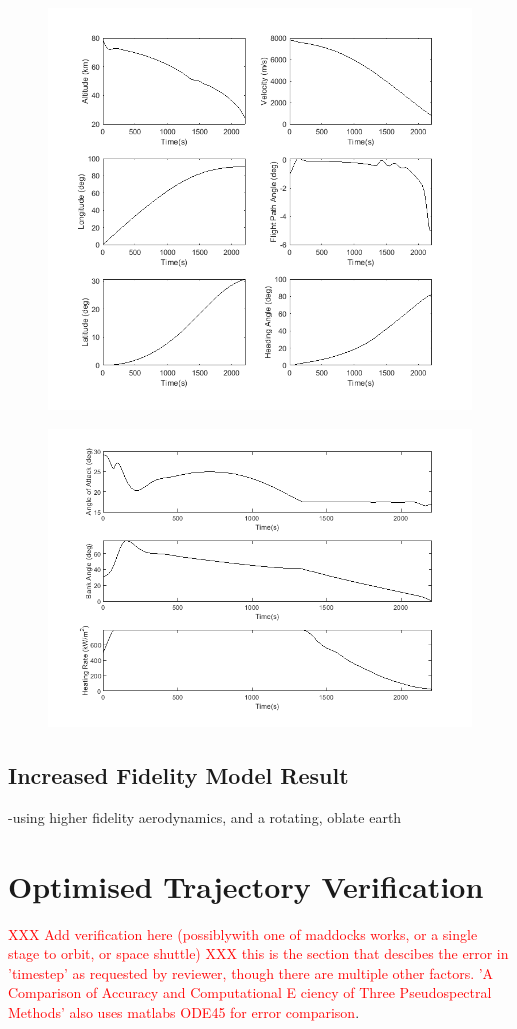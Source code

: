 \begin{figure}[H]
\centering
\includegraphics[width=0.7\linewidth]{figures/A1_uncertainty-analysis/SpaceShuttleq1}
\caption{}
\label{fig:SpaceShuttleq1}
\end{figure}
\begin{figure}[H]
\centering
\includegraphics[width=0.7\linewidth]{figures/A1_uncertainty-analysis/SpaceShuttleq2}
\caption{}
\label{fig:SpaceShuttleq2}
\end{figure}

\subsection{Increased Fidelity Model Result}
-using higher fidelity aerodynamics, and a rotating, oblate earth


\section{Optimised Trajectory Verification}

\textcolor{red}{XXX Add verification here (possiblywith one of maddocks works, or a single stage to orbit, or space shuttle)}
\textcolor{red}{XXX  this is the section that descibes the error in 'timestep' as requested by reviewer, though there are multiple other factors. 'A Comparison of Accuracy and Computational E ciency of Three Pseudospectral Methods' also uses matlabs ODE45 for error comparison}.

